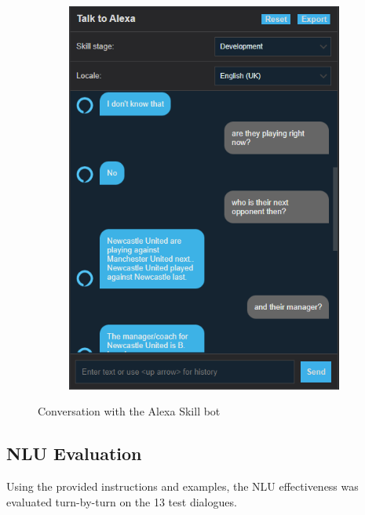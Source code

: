 \documentclass[10pt,a4paper,twocolumn]{article}
\newcommand{\cmmnt}[1]{}
\begin{document}
\begin{figure}[h!]
\begin{subfigure}[b]{0.24\textwidth}
        \includegraphics[width=\textwidth]{assets/Screenshot_4.png}
    \end{subfigure}
    \caption*{Conversation with the Alexa Skill bot}
    \vspace{0.5cm}
\end{figure}

\subsection{NLU Evaluation \cmmnt{\small (5 marks)}}

Using the provided instructions and examples, the NLU effectiveness was evaluated turn-by-turn on the 13 test dialogues.
\end{document}
